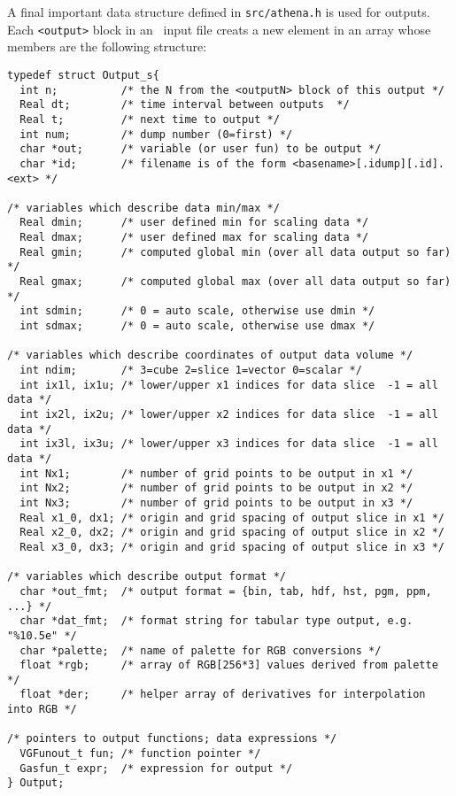 A final important data structure defined in {\tt src/athena.h} is used
for outputs.  Each {\tt <output>} block in an \ath\ input file creats
a new element in an array whose members are the following structure:

\footnotesize
\begin{verbatim}
typedef struct Output_s{
  int n;          /* the N from the <outputN> block of this output */
  Real dt;        /* time interval between outputs  */
  Real t;         /* next time to output */
  int num;        /* dump number (0=first) */
  char *out;      /* variable (or user fun) to be output */
  char *id;       /* filename is of the form <basename>[.idump][.id].<ext> */

/* variables which describe data min/max */
  Real dmin;      /* user defined min for scaling data */
  Real dmax;      /* user defined max for scaling data */
  Real gmin;      /* computed global min (over all data output so far) */
  Real gmax;      /* computed global max (over all data output so far) */
  int sdmin;      /* 0 = auto scale, otherwise use dmin */
  int sdmax;      /* 0 = auto scale, otherwise use dmax */

/* variables which describe coordinates of output data volume */
  int ndim;       /* 3=cube 2=slice 1=vector 0=scalar */
  int ix1l, ix1u; /* lower/upper x1 indices for data slice  -1 = all data */
  int ix2l, ix2u; /* lower/upper x2 indices for data slice  -1 = all data */
  int ix3l, ix3u; /* lower/upper x3 indices for data slice  -1 = all data */
  int Nx1;        /* number of grid points to be output in x1 */
  int Nx2;        /* number of grid points to be output in x2 */
  int Nx3;        /* number of grid points to be output in x3 */
  Real x1_0, dx1; /* origin and grid spacing of output slice in x1 */
  Real x2_0, dx2; /* origin and grid spacing of output slice in x2 */
  Real x3_0, dx3; /* origin and grid spacing of output slice in x3 */

/* variables which describe output format */
  char *out_fmt;  /* output format = {bin, tab, hdf, hst, pgm, ppm, ...} */
  char *dat_fmt;  /* format string for tabular type output, e.g. "%10.5e" */
  char *palette;  /* name of palette for RGB conversions */
  float *rgb;     /* array of RGB[256*3] values derived from palette */
  float *der;     /* helper array of derivatives for interpolation into RGB */

/* pointers to output functions; data expressions */
  VGFunout_t fun; /* function pointer */
  Gasfun_t expr;  /* expression for output */
} Output;
\end{verbatim}
\normalsize


